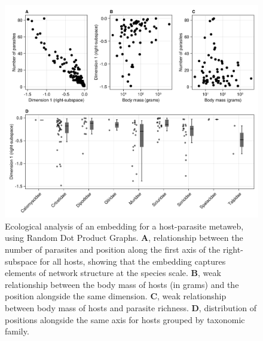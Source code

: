 \begin{refsection}
\begin{figure}[h]
    \centering
    \includegraphics[width=\textwidth]{figures/illustration-part2.png}
    \caption{Ecological analysis of an embedding for a host-parasite
metaweb, using Random Dot Product Graphs. \textbf{A}, relationship
between the number of parasites and position along the first axis of the
right-subspace for all hosts, showing that the embedding captures
elements of network structure at the species scale. \textbf{B}, weak
relationship between the body mass of hosts (in grams) and the position
alongside the same dimension. \textbf{C}, weak relationship between body
mass of hosts and parasite richness. \textbf{D}, distribution of
positions alongside the same axis for hosts grouped by taxonomic
family.}
    \label{fig:illustration2}
\end{figure}

\clearpage


\end{refsection}

